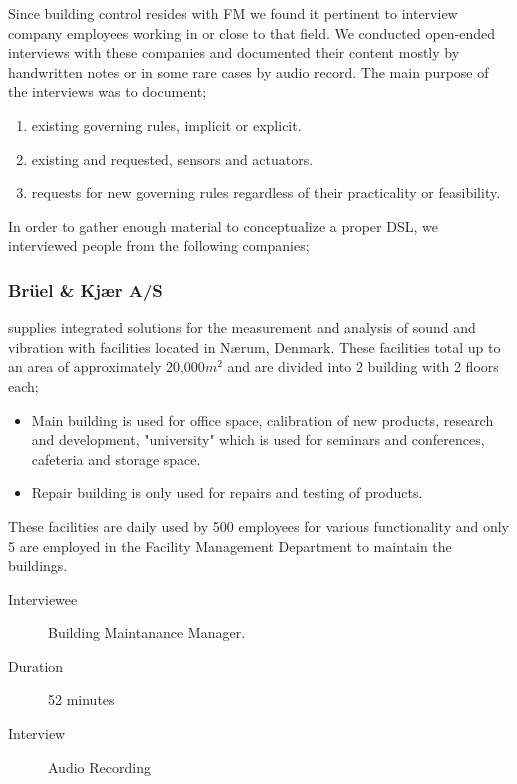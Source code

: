 Since building control resides with FM we found it pertinent to interview company employees working in or close to that field. We conducted open-ended interviews with these companies and documented their content mostly by handwritten notes or in some rare cases by audio record. The main purpose of the interviews was to document;

\begin{enumerate}
	\item existing governing rules, implicit or explicit.
	\item existing and requested, sensors and actuators.
	\item requests for new governing rules regardless of their practicality or feasibility.
\end{enumerate}

In order to gather enough material to conceptualize a proper DSL, we interviewed people from the following companies;

\subsubsection{Br\"{u}el \& Kj\ae r A/S} supplies integrated solutions for the measurement and analysis of sound and vibration with facilities located in N\ae rum, Denmark. These facilities total up to an area of approximately 20,000$m^2$ and are divided into 2 building with 2 floors each; 
\begin{itemize}
	\item Main building is used for office space, calibration of new products, research and development, "university" which is used for seminars and conferences, cafeteria and storage space.
	\item Repair building is only used for repairs and testing of products.
\end{itemize}	
These facilities are daily used by 500 employees for various functionality and only 5 are employed in the Facility Management Department to maintain the buildings.
\begin{description}
	\item[Interviewee] Building Maintanance Manager.
	\item[Duration] 52 minutes
	\item[Interview] Audio Recording
\end{description}

